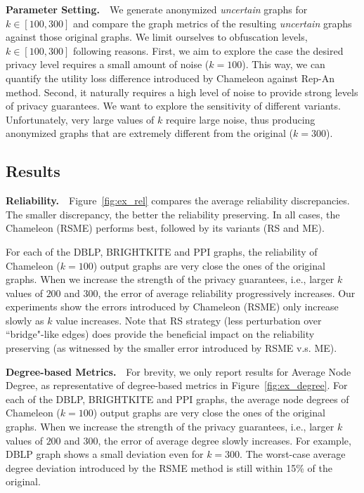 \textbf{Parameter Setting.}~~We generate anonymized \emph{uncertain} graphs for $k \in [100,300]$ and compare the graph metrics of the resulting \emph{uncertain} graphs against those original graphs. We limit ourselves to obfuscation levels, $k \in [100,300]$ following reasons. 
First, we aim to explore the case the desired privacy level requires a small amount of noise ($k=100$). This way, we can quantify the utility loss difference introduced by Chameleon against Rep-An method. Second, it naturally requires a high level of noise to provide strong levels of privacy guarantees. We want to explore the sensitivity of different variants. Unfortunately, very large values of $k$ require large noise, thus producing anonymized graphs that are extremely different from the original ($k=300$). 


\subsection{Results}
\textbf{Reliability.}~~Figure~\ref{fig:ex_rel} compares the average reliability discrepancies. The smaller discrepancy, the better the reliability preserving. In all cases, the Chameleon (RSME) performs best, followed by its variants (RS and ME).

For each of the DBLP, BRIGHTKITE and PPI graphs, the reliability of Chameleon ($k=100$) output graphs are very close the ones of the original graphs. When we increase the strength of the privacy guarantees, i.e., larger $k$ values of $200$ and $300$, the error of average reliability progressively increases. Our experiments show the errors introduced by Chameleon (RSME) only increase slowly as $k$ value increases. Note that RS strategy (less perturbation over ``bridge"-like edges) does provide the beneficial impact on the reliability preserving (as witnessed by the smaller error introduced by RSME v.s. ME).

\textbf{Degree-based Metrics.}~~For brevity, we only report results for  Average Node Degree, as representative of degree-based metrics in Figure~\ref{fig:ex_degree}. For each of the DBLP, BRIGHTKITE and PPI graphs, the average node degrees of Chameleon ($k=100$) output graphs are very close the ones of the original graphs. When we increase the strength of the privacy guarantees, i.e., larger $k$ values of $200$ and $300$, the error of average degree slowly increases. For example, DBLP graph shows a small deviation even for $k=300$. The worst-case average degree deviation introduced by the RSME method is still within 15\% of the original. 

